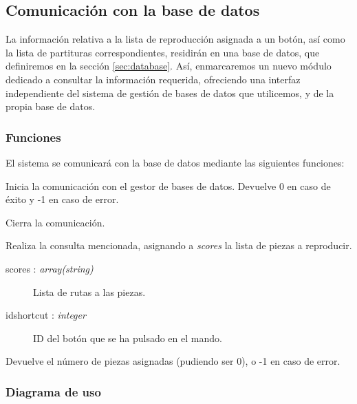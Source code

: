 \smallskip

\subsection{Comunicación con la base de datos}

La información relativa a la lista de reproducción asignada a un botón, así como la lista de partituras correspondientes, residirán en una base de datos, que definiremos en la sección \ref{sec:database}. Así, enmarcaremos un nuevo módulo dedicado a consultar la información requerida, ofreciendo una interfaz independiente del sistema de gestión de bases de datos que utilicemos, y de la propia base de datos.

\subsubsection{Funciones}

El sistema se comunicará con la base de datos mediante las siguientes funciones:

\begin{description}[style=nextline]
	\item[db\_init () : \textit{integer}]
	Inicia la comunicación con el gestor de bases de datos. Devuelve 0 en caso de éxito y -1 en caso de error.
	
	\item[db\_destroy ()]
	Cierra la comunicación.
	
	\item[db\_query (scores, idshortcut) : \textit{integer}]
	Realiza la consulta mencionada, asignando a \textit{scores} la lista de piezas a reproducir.
	
	\begin{description}
		\item[scores : \textit{array(string)}] Lista de rutas a las piezas.
		\item[idshortcut : \textit{integer}] ID del botón que se ha pulsado en el mando.
	\end{description}
	
	Devuelve el número de piezas asignadas (pudiendo ser 0), o -1 en caso de error.
	
\end{description}

\subsubsection{Diagrama de uso}

